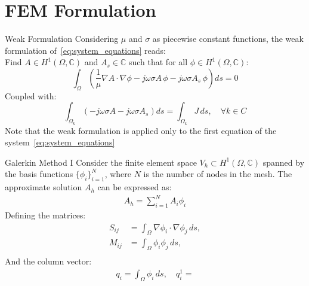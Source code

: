 \documentclass[aspectratio=54,xcolor=dvipsnames]{beamer}
\begin{document}
\section{FEM Formulation}
\begin{frame}{Weak Formulation}
    Considering $\mu$ and $\sigma$ as piecewise constant functions, the weak formulation of~\eqref{eq:system_equations} reads: \\
    Find $A \in H^1(\Omega, \mathbb{C})$ and $A_s \in \mathbb{C}$ such that for all $\phi \in H^1(\Omega, \mathbb{C})$:
    \begin{equation} 
        \int_{\Omega} \left( \frac{1}{\mu} \nabla A \cdot \nabla \phi - j\omega \sigma A \, \phi - j\omega \sigma A_s \, \phi \right) ds = 0
        \label{eq:weak_formulation}
    \end{equation}
    Coupled with:
    \begin{equation}
        \int_{\Omega_k} \left(- j\omega \sigma A - j\omega \sigma A_s \right) ds = \int_{\Omega_k} J \, ds, \quad \forall k \in C
        \label{eq:current_constraint_weak}
    \end{equation}
    Note that the weak formulation is applied only to the first equation of the system~\eqref{eq:system_equations}
\end{frame}

\begin{frame}{Galerkin Method I}
    Consider the finite element space $V_h \subset H^1(\Omega, \mathbb{C})$ spanned by the basis functions $\{\phi_i\}_{i=1}^{N}$, where $N$ is the number of nodes in the mesh. The approximate solution $A_h$ can be expressed as:
    \begin{align*}
        A_h = \sum_{i=1}^{N} A_i \phi_i
    \end{align*}
    Defining the matrices:
    \begin{align*}
        S_{ij} &= \int_{\Omega} \nabla \phi_i \cdot \nabla \phi_j \, ds, \\
        M_{ij} &= \int_{\Omega} \phi_i \phi_j \, ds, \\
    \end{align*}
    And the column vector:
    \begin{align*}
        q_i = \int_{\Omega} \phi_i \, ds, \quad q^1_i = 
    \end{align*}
\end{frame}
\end{document}
